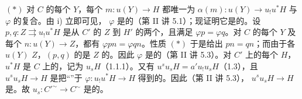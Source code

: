 \noindent $(*)$ 对 $C$ 的每个 $Y$，每个 $m:u(Y)\to H$ 都唯一为 $\alpha(m):u(Y)\to u_!u^*H$ 与 $\varphi$ 的复合。由 i) 立即可见， $\varphi$ 是的（第 II 讲 5.1）；现证明它是的。设 $p,q:Z\rightrightarrows u_!u^*H$ 是从 $C'$ 的 $Z$ 到 $H'$ 的两个，且满足 $\varphi p=\varphi q$。对 $C$ 的每个 $Y$ 及每个 $n:u(Y)\to Z$，都有 $\varphi pn=\varphi qn$。性质 $(*)$ 于是给出 $pn=qn$；而由于各 $u(Y)$  $Z$，$(p,q)$ 的是 $Z$ 的。因此 $\varphi$ 是的（第 II 讲 5.3）。对 $C'$ 上的每个 $H$，$u^*H$ 是 $C$ 上的，记为 $u_sH$（1.1.1）。又有 $u^su_sH=a'u_!u_sH$（1.3），且 $u^su_sH\to H$ 是把“”于 $\varphi:u_!u^*H\to H$ 得到的。因此（第 II 讲 5.3）， $u^su_sH\to H$ 是。故 $u_s:C'^{\sim}\to C^{\sim}$ 是的。

